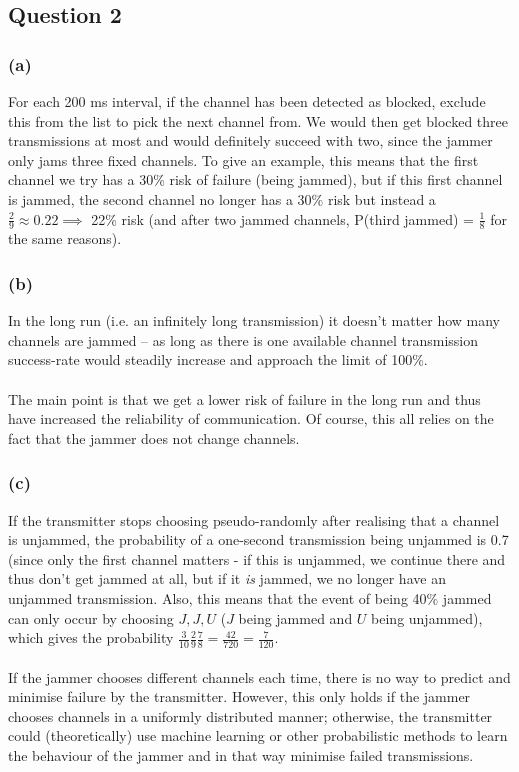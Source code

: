\documentclass{article}
\begin{document}
\subsection*{Question 2}

\subsubsection*{(a)}

For each 200 ms interval, if the channel has been detected as blocked, exclude this from the list to pick the next channel from.
We would then get blocked three transmissions at most and would definitely succeed with two, since the jammer only jams three fixed channels. To give an example, this means that the first channel we try has a 30\% risk of failure (being jammed), but if this first channel is jammed, the second channel no longer has a 30\% risk but instead a $\frac{2}{9} \approx 0.22 \implies$ 22\% risk (and after two jammed channels, P(third jammed) = $\frac{1}{8}$ for the same reasons).

\subsubsection*{(b)}

In the long run (i.e. an infinitely long transmission) it doesn't matter how many channels are jammed -- as long as there is one available channel transmission success-rate would steadily increase and approach the limit of 100\%.
\\
\\
The main point is that we get a lower risk of failure in the long run and thus have increased the reliability of communication. Of course, this all relies on the fact that the jammer does not change channels.

\subsubsection*{(c)}

If the transmitter stops choosing pseudo-randomly after realising that a channel is unjammed, the probability of a one-second transmission being unjammed is 0.7 (since only the first channel matters - if this is unjammed, we continue there and thus don't get jammed at all, but if it \textit{is} jammed, we no longer have an unjammed transmission. Also, this means that the event of being 40\% jammed can only occur by choosing $J, J, U$ ($J$ being jammed and $U$ being unjammed), which gives the probability $\frac{3}{10} \frac{2}{9} \frac{7}{8} = \frac{42}{720} = \frac{7}{120}$.
\\
\\
If the jammer chooses different channels each time, there is no way to predict and minimise failure by the transmitter.
However, this only holds if the jammer chooses channels in a uniformly distributed manner; otherwise, the transmitter could (theoretically) use machine learning or other probabilistic methods to learn the behaviour of the jammer and in that way minimise failed transmissions.
\end{document}

